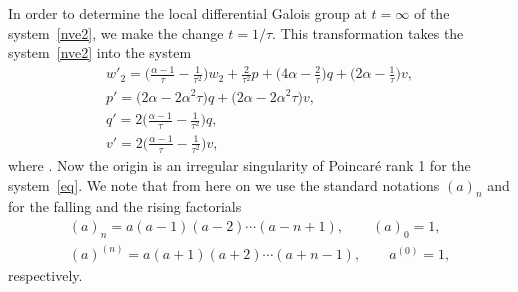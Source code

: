 \documentclass[10pt,a4paper]{amsart}
\numberwithin{equation}{section}
\begin{document}
 In order to determine the local differential Galois group at $t=\infty$ of the system~\eqref{nve2}, we make the
 change $t=1/\tau$. This transformation takes the system~\eqref{nve2} into the system
 \begin{gather}
 w'_2 =
 \biggl(\frac{\alpha-1}{\tau} - \frac{1}{\tau^2}\biggr) w_2 + \frac{2}{\tau^2} p
 + \biggl(4 \alpha -\frac{2}{\tau}\biggr) q + \biggl(2 \alpha - \frac{1}{\tau}\biggr) v,\nonumber\\
 p' =
 \bigl(2 \alpha - 2 \alpha^2 \tau\bigr) q + \bigl(2 \alpha - 2 \alpha^2 \tau\bigr) v,\nonumber\\
 q' =
 2 \biggl(\frac{\alpha-1}{\tau} - \frac{1}{\tau^2}\biggr) q,\nonumber\\
 v' =
 2 \biggl(\frac{\alpha-1}{\tau} - \frac{1}{\tau^2}\biggr) v ,\label{eq}
 \end{gather}
 where . Now the origin is an irregular singularity of Poincar\'{e} rank 1 for the system~\eqref{eq}.
 We note that from here on we use the standard notations $(a)_n$ and  for the falling and the rising factorials
 \begin{gather*}
 (a)_n=a (a-1) (a-2) \cdots (a-n+1), \qquad (a)_0=1,\\
 (a)^{(n)}=a (a+1) (a+2) \cdots (a+n-1), \qquad a^{(0)}=1,
 \end{gather*}
 respectively.
\end{document}
